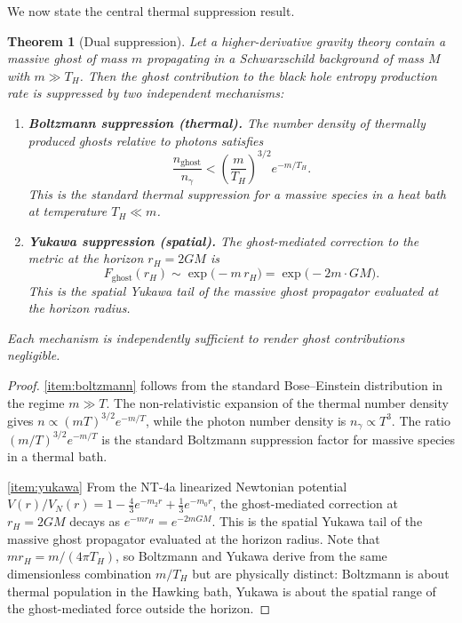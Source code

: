 \documentclass[11pt,a4paper]{article}
\newcommand{\Thr}{T_{\!\scriptscriptstyle H}}
\theoremstyle{plain}
\newtheorem{theorem}{Theorem}[section]
\theoremstyle{definition}
\begin{document}
We now state the central thermal suppression result.

\begin{theorem}[Dual suppression]\label{thm:dual}
  Let a higher-derivative gravity theory contain a massive ghost of
  mass $m$ propagating in a Schwarzschild background of mass $M$ with
  $m \gg \Thr$.  Then the ghost contribution to the black hole entropy
  production rate is suppressed by two independent mechanisms:
  \begin{enumerate}[label=\textup{(\Roman*)}]
    \item\label{item:boltzmann}
      \textbf{Boltzmann suppression (thermal).}
      The number density of thermally produced ghosts relative to
      photons satisfies
      \begin{equation}\label{eq:boltzmann}
        \frac{n_{\mathrm{ghost}}}{n_\gamma}
        < \left(\frac{m}{\Thr}\right)^{\!3/2}
          e^{-m/\Thr}.
      \end{equation}
      This is the standard thermal suppression for a massive species in
      a heat bath at temperature $\Thr \ll m$.

    \item\label{item:yukawa}
      \textbf{Yukawa suppression (spatial).}
      The ghost-mediated correction to the metric at the horizon
      $r_H = 2GM$ is
      \begin{equation}\label{eq:yukawa}
        F_{\mathrm{ghost}}(r_H)
        \sim \exp\!\bigl(-m\,r_H\bigr)
        = \exp\!\bigl(-2m\cdot GM\bigr).
      \end{equation}
      This is the spatial Yukawa tail of the massive ghost propagator
      evaluated at the horizon radius.
  \end{enumerate}
  Each mechanism is \emph{independently sufficient} to render ghost
  contributions negligible.
\end{theorem}

\begin{proof}
  \ref{item:boltzmann} follows from the standard Bose--Einstein
  distribution in the regime $m \gg T$.  The non-relativistic
  expansion of the thermal number density gives
  $n \propto (mT)^{3/2}e^{-m/T}$, while the photon number density is
  $n_\gamma \propto T^3$.  The ratio
  $(m/T)^{3/2}e^{-m/T}$ is the standard Boltzmann suppression factor
  for massive species in a thermal bath.

  \ref{item:yukawa} From the NT-4a linearized Newtonian potential
  $V(r)/V_N(r) = 1 - \tfrac{4}{3}e^{-m_2 r} + \tfrac{1}{3}e^{-m_0 r}$,
  the ghost-mediated correction at $r_H = 2GM$ decays as
  $e^{-m r_H} = e^{-2mGM}$.  This is the spatial Yukawa tail of the
  massive ghost propagator evaluated at the horizon radius.  Note that
  $m r_H = m/(4\pi\Thr)$, so Boltzmann and Yukawa derive from the
  same dimensionless combination $m/\Thr$ but are physically distinct:
  Boltzmann is about thermal population in the Hawking bath, Yukawa is
  about the spatial range of the ghost-mediated force outside the
  horizon.
\end{proof}
\end{document}
